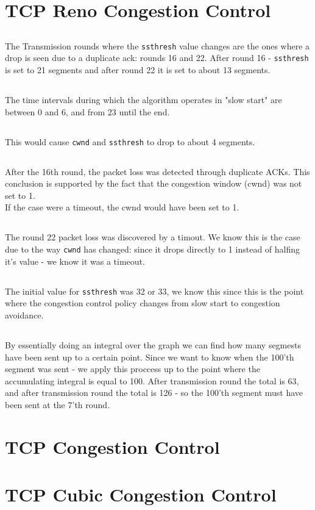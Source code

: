 \documentclass{article}
\begin{document}
\section{TCP Reno Congestion Control}
\subsection{}
The Transmission rounds where the \texttt{ssthresh} value
changes are the ones where a drop is seen due to a duplicate ack:
rounds 16 and 22. After round 16 - \texttt{ssthresh} is set to 21 segments
and after round 22 it is set to about 13 segments.

\subsection{}
The time intervals during which the algorithm operates in "slow start"
are between 0 and 6, and from 23 until the end.

\subsection{}
This would cause \texttt{cwnd} and \texttt{ssthresh}
to drop to about 4 segments.

\subsection{}
After the 16th round, the packet loss was detected through duplicate ACKs.
This conclusion is supported by the fact that the congestion window (cwnd) was not set to 1.\\
If the case were a timeout, the cwnd would have been set to 1.


\subsection{}
The round 22 packet loss was discovered by a timout. We know this is
the case due to the way \texttt{cwnd} has changed: since it drops
directly to 1 instead of halfing it's value - we know it was a timeout.

\subsection{}
The initial value for \texttt{ssthresh} was 32 or 33,
we know this since this is the point where the congestion control
policy changes from slow start to congestion avoidance.

\subsection{}
By essentially doing an integral over the graph we can find
how many segmests have been sent up to a certain point. Since we want to
know when the 100'th segment was sent - we apply this proccess up to the point
where the accumulating integral is equal to 100.
After transmission round the total is 63,
and after transmission round the total is 126
- so the 100'th segment must have been sent at the 7'th round.

\section{TCP Congestion Control}
\section{TCP Cubic Congestion Control}
\end{document}
